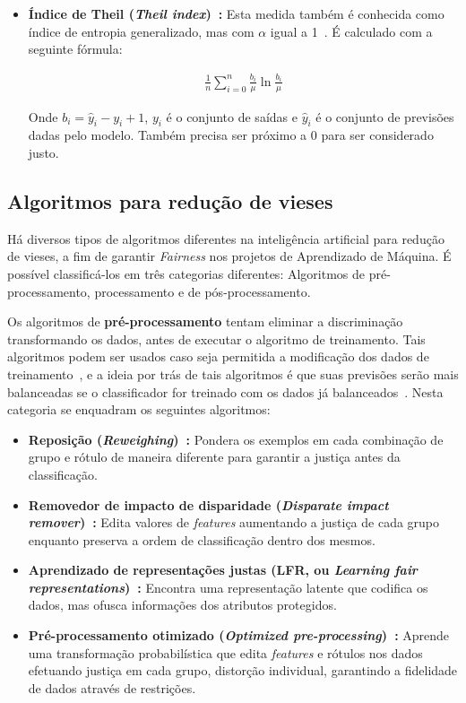 \documentclass[portugues]{ic-tese}
\begin{document}
\begin{itemize}
\item \textbf{Índice de Theil (\textit{Theil index})~\citep{Speicher_2018}:} Esta medida também é conhecida como índice de entropia generalizado, mas com $\alpha$ igual a 1~\citep{Speicher_2018}. É calculado com a seguinte fórmula:

\begin{align*}
\frac{1}{n}\sum^{n}_{i=0}\frac{b_i}{\mu}\ln{\frac{b_i}{\mu}}
\end{align*}

Onde $b_i = \hat{y}_i - y_i + 1$, $y_i$ é o conjunto de saídas e $\hat{y}_i$ é o conjunto de previsões dadas pelo modelo. Também precisa ser próximo a 0 para ser considerado justo.

\end{itemize}

\subsection{Algoritmos para redução de vieses}
\label{sec:unbiasedAlgorithms}

Há diversos tipos de algoritmos diferentes na inteligência artificial para redução de vieses, a fim de garantir \textit{Fairness} nos projetos de Aprendizado de Máquina. É possível classificá-los em três categorias diferentes: Algoritmos de pré-processamento, processamento e de pós-processamento.

Os algoritmos de \textbf{pré-processamento} tentam eliminar a discriminação transformando os dados, antes de executar o algoritmo de treinamento. Tais algoritmos podem ser usados caso seja permitida a modificação dos dados de treinamento~\citep{dAlessandro_2017}, e a ideia por trás de tais algoritmos é que suas previsões serão mais balanceadas se o classificador for treinado com os dados já balanceados~\citep{Kamiran_2009}. Nesta categoria se enquadram os seguintes algoritmos:

\begin{itemize}
\item \textbf{Reposição (\textit{Reweighing})~\citep{Kamiran_2011}:} Pondera os exemplos em cada combinação de grupo e rótulo de maneira diferente para garantir a justiça antes da classificação.

\item \textbf{Removedor de impacto de disparidade (\textit{Disparate impact remover})~\citep{Feldman_2015}:} Edita valores de \textit{features} aumentando a justiça de cada grupo enquanto preserva a ordem de classificação dentro dos mesmos.

\item \textbf{Aprendizado de representações justas (LFR, ou \textit{Learning fair representations})~\citep{Zemel_2013}:} Encontra uma representação latente que codifica os dados, mas ofusca informações dos atributos protegidos.

\item \textbf{Pré-processamento otimizado (\textit{Optimized pre-processing})~\citep{Calmon_2017}:} Aprende uma transformação probabilística que edita \textit{features} e rótulos nos dados efetuando justiça em cada grupo, distorção individual, garantindo a fidelidade de dados através de restrições.
\end{itemize}
\end{document}
